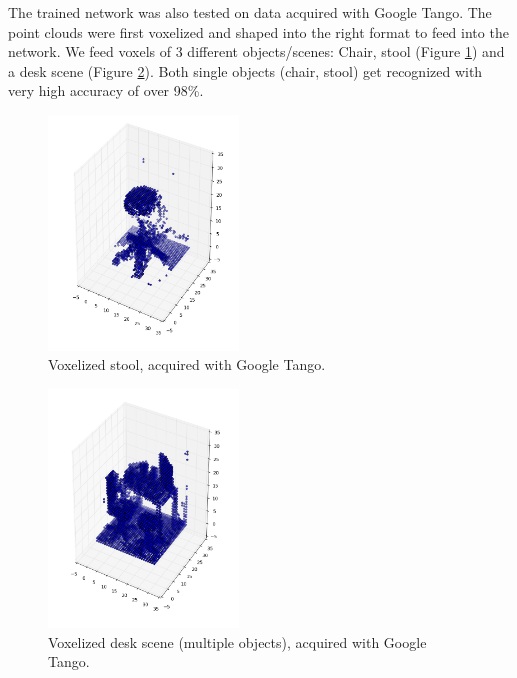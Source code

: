 \documentclass[10pt,twocolumn,letterpaper]{article}
\begin{document}
\vspace{0.3cm}
The trained network was also tested on data acquired with Google Tango. The point clouds were first voxelized
and shaped into the right format to feed into the network. We feed voxels of 3 different objects/scenes: Chair, 
stool (Figure \ref{fig:voxel_stool}) and a desk scene (Figure \ref{fig:voxel_desk}). Both single objects (chair, 
stool) get recognized with very high accuracy of over 98\%.

\begin{figure}[h]
	\centering
	\includegraphics[width=0.45\textwidth]{figures/tango_voxel_stool}
	\caption{Voxelized stool, acquired with Google Tango.}
	\label{fig:voxel_stool}
\end{figure}


\begin{figure}[h]
	\centering
	\includegraphics[width=0.45\textwidth]{figures/tango_voxel_desk_scene}
	\caption{Voxelized desk scene (multiple objects), acquired with Google Tango.}
	 \label{fig:voxel_desk}
\end{figure}
\end{document}
